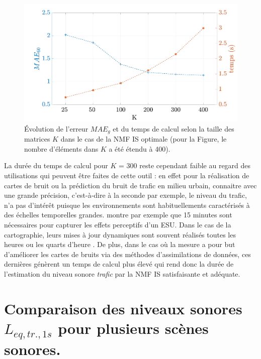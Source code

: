 \begin{figure}
\centering
\includegraphics[width=.7\linewidth]{./figures/resultats/timeErrorNMF_IS_K.pdf}
\caption{Évolution de l'erreur $MAE_g$ et du temps de calcul selon la taille des matrices $K$ dans le cas de la NMF IS optimale (pour la Figure, le nombre d'éléments dans $K$ a été étendu à 400).} 
\label{fig:errorTime}
\end{figure}

La durée du temps de calcul pour $K$ = 300 reste cependant faible au regard des utilisations qui peuvent être faites de cette outil : en effet pour la réalisation de cartes de bruit ou la prédiction du bruit de trafic en milieu urbain, connaitre avec une grande précision, c'est-à-dire à la seconde par exemple, le niveau du trafic, n'a pas d'intérêt puisque les environnements sont habituellements caractérisés à des échelles temporelles grandes. \cite{broccoline} montre par exemple que 15 minutes sont nécessaires pour capturer les effets perceptifs d'un ESU. Dans le cas de la cartographie, leurs mises à jour dynamiques sont souvent réalisés toutes les heures \cite{bellucci_life_2017} ou les quarts d'heure \cite{wei2016dynamic}. De plus, dans le cas où la mesure a pour but d'améliorer les cartes de bruits via des méthodes d'assimilations de données, ces dernières génèrent un temps de calcul plus élevé qui rend donc la durée de l'estimation du niveau sonore \textit{trafic} par la NMF IS satisfaisante et adéquate.

\section{Comparaison des niveaux sonores $L_{eq,tr.,1s}$ pour plusieurs scènes sonores.}

